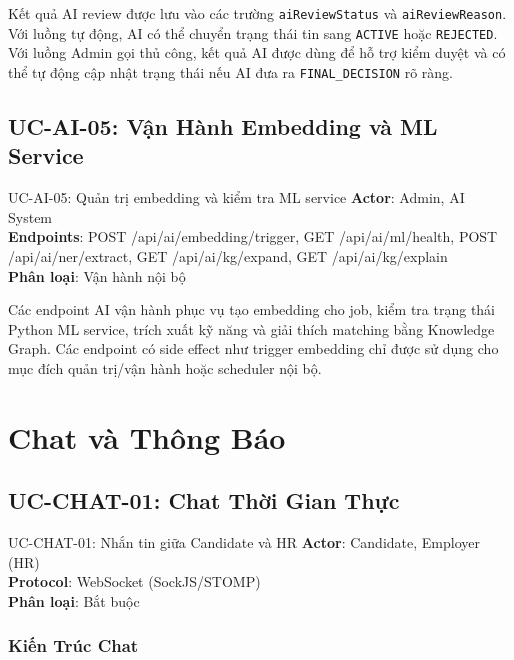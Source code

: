 \documentclass[12pt, a4paper]{report}
\begin{document}
Kết quả AI review được lưu vào các trường \texttt{aiReviewStatus} và \texttt{aiReviewReason}. Với luồng tự động, AI có thể chuyển trạng thái tin sang \texttt{ACTIVE} hoặc \texttt{REJECTED}. Với luồng Admin gọi thủ công, kết quả AI được dùng để hỗ trợ kiểm duyệt và có thể tự động cập nhật trạng thái nếu AI đưa ra \texttt{FINAL\_DECISION} rõ ràng.

\section{UC-AI-05: Vận Hành Embedding và ML Service}

\begin{requirementbox}{UC-AI-05: Quản trị embedding và kiểm tra ML service}
\textbf{Actor}: Admin, AI System \\
\textbf{Endpoints}: POST /api/ai/embedding/trigger, GET /api/ai/ml/health, POST /api/ai/ner/extract, GET /api/ai/kg/expand, GET /api/ai/kg/explain \\
\textbf{Phân loại}: Vận hành nội bộ
\end{requirementbox}

Các endpoint AI vận hành phục vụ tạo embedding cho job, kiểm tra trạng thái Python ML service, trích xuất kỹ năng và giải thích matching bằng Knowledge Graph. Các endpoint có side effect như trigger embedding chỉ được sử dụng cho mục đích quản trị/vận hành hoặc scheduler nội bộ.

\chapter{Chat và Thông Báo}

\section{UC-CHAT-01: Chat Thời Gian Thực}

\begin{requirementbox}{UC-CHAT-01: Nhắn tin giữa Candidate và HR}
\textbf{Actor}: Candidate, Employer (HR) \\
\textbf{Protocol}: WebSocket (SockJS/STOMP) \\
\textbf{Phân loại}: Bắt buộc
\end{requirementbox}

\subsection{Kiến Trúc Chat}
\end{document}
